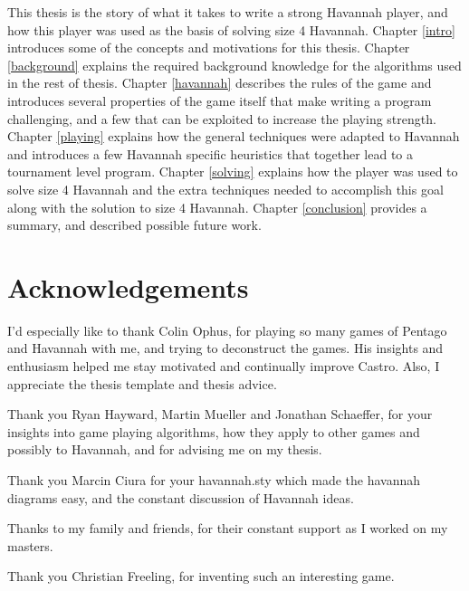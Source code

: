 This thesis is the story of what it takes to write a strong Havannah player, and how this player was used as the basis of solving size 4 Havannah. Chapter \ref{intro} introduces some of the concepts and motivations for this thesis. Chapter \ref{background} explains the required background knowledge for the algorithms used in the rest of thesis. Chapter \ref{havannah} describes the rules of the game and introduces several properties of the game itself that make writing a program challenging, and a few that can be exploited to increase the playing strength. Chapter \ref{playing} explains how the general techniques were adapted to Havannah and introduces a few Havannah specific heuristics that together lead to a tournament level program. Chapter \ref{solving} explains how the player was used to solve size 4 Havannah and the extra techniques needed to accomplish this goal along with the solution to size 4 Havannah. Chapter \ref{conclusion} provides a summary, and described possible future work.



  \newpage
   \chapter*{Acknowledgements}
   \thispagestyle{empty}
   \vspace*{-0.7in}
   \small{

I'd especially like to thank Colin Ophus, for playing so many games of Pentago and Havannah with me, and trying to deconstruct the games. His insights and enthusiasm helped me stay motivated and continually improve Castro. Also, I appreciate the thesis template and thesis advice.

Thank you Ryan Hayward, Martin Mueller and Jonathan Schaeffer, for your insights into game playing algorithms, how they apply to other games and possibly to Havannah, and for advising me on my thesis.

Thank you Marcin Ciura for your havannah.sty which made the havannah diagrams easy, and the constant discussion of Havannah ideas.

Thanks to my family and friends, for their constant support as I worked on my masters.

Thank you Christian Freeling, for inventing such an interesting game.

   }

